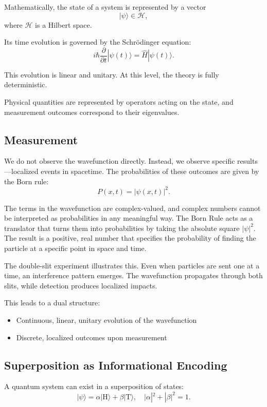Mathematically, the state of a system is represented by a vector
\[
|\psi\rangle \in \mathcal{H},
\]
where $\mathcal{H}$ is a Hilbert space.

Its time evolution is governed by the Schrödinger equation:
\[
i\hbar \frac{\partial}{\partial t} |\psi(t)\rangle = \hat{H} |\psi(t)\rangle.
\]

This evolution is linear and unitary. At this level, the theory is fully deterministic.

Physical quantities are represented by operators acting on the state, and measurement outcomes correspond to their eigenvalues.

\subsection*{Measurement}

We do not observe the wavefunction directly. Instead, we observe specific results—localized events in spacetime.
The probabilities of these outcomes are given by the Born rule:
\[
P(x,t) = |\psi(x,t)|^2.
\]

The terms in the wavefunction are complex-valued, and complex numbers cannot be interpreted as probabilities in any meaningful way.
The Born Rule acts as a translator that turns them into probabilities by taking the absolute square \( |\psi|^2 \).
The result is a positive, real number that specifies the probability of finding the particle at a specific point in space and time.

The double-slit experiment illustrates this.
Even when particles are sent one at a time, an interference pattern emerges.
The wavefunction propagates through both slits, while detection produces localized impacts.

This leads to a dual structure:

\begin{itemize}
\item Continuous, linear, unitary evolution of the wavefunction
\item Discrete, localized outcomes upon measurement
\end{itemize}

\subsection*{Superposition as Informational Encoding}

A quantum system can exist in a superposition of states:
\[
|\psi\rangle = \alpha |\text{H}\rangle + \beta |\text{T}\rangle,
\quad
|\alpha|^2 + |\beta|^2 = 1.
\]

